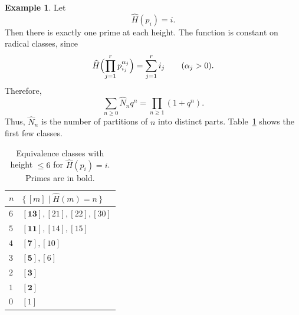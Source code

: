 \documentclass[11pt]{article}
\theoremstyle{definition}
\newtheorem{example}{Example}
\begin{document}
\begin{example}\label{eg:sf-distinct}
Let
\[
  \widehat H(p_i)=i.
\]
Then there is exactly one prime at each height.  The function is constant on
radical classes, since
\[
  \widehat H\Bigl(\prod_{j=1}^r p_{i_j}^{\alpha_j}\Bigr)
  =
  \sum_{j=1}^r i_j
  \qquad(\alpha_j>0).
\]
Therefore,
\[
  \sum_{n\ge0}\widehat N_nq^n
  =
  \prod_{n\ge1}(1+q^n).
\]
Thus, \(\widehat N_n\) is the number of partitions of \(n\) into distinct parts.  Table~\ref{tab:sf-distinct} shows the first few classes.
\begin{table}[ht]
\centering
\begin{tabular}{|l|l|}
\hline\hline
\(n\) & \(\{\, [m]\mid \widehat H(m)=n \,\}\)\\
\hline
\(6\) & \(\mathbf{[13]}, [21], [22], [30]\) \\
\(5\) & \(\mathbf{[11]}, [14], [15]\) \\
\(4\) & \(\mathbf{[7]}, [10]\) \\
\(3\) & \(\mathbf{[5]}, [6]\) \\
\(2\) & \(\mathbf{[3]}\) \\
\(1\) & \(\mathbf{[2]}\) \\
\(0\) & \([1]\) \\
\hline
\end{tabular}
\caption{Equivalence classes with height \(\le6\) for
\(\widehat H(p_i)=i\).  Primes are in bold.}
\label{tab:sf-distinct}
\end{table}
\end{example}
\end{document}
